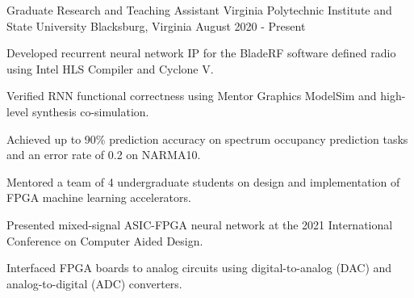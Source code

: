 


\begin{cventries}



\cventry
{Graduate Research and Teaching Assistant} %
{Virginia Polytechnic Institute and State University} %
{Blacksburg, Virginia} %
{August 2020 - Present} %
{ %
\begin{cvitems}
\item {Developed recurrent neural network IP for the BladeRF software defined radio using Intel HLS Compiler and Cyclone V.}
\item {Verified RNN functional correctness using Mentor Graphics ModelSim and high-level synthesis co-simulation.}
\item {Achieved up to 90\% prediction accuracy on spectrum occupancy prediction tasks and an error rate of 0.2 on NARMA10.}
\item{Mentored a team of 4 undergraduate students on design and implementation of FPGA machine learning accelerators.}
\item{Presented mixed-signal ASIC-FPGA neural network at the 2021 International Conference on Computer Aided Design.}
\item{Interfaced FPGA boards to analog circuits using digital-to-analog (DAC) and analog-to-digital (ADC) converters.}
\end{cvitems}
}


\end{cventries}
